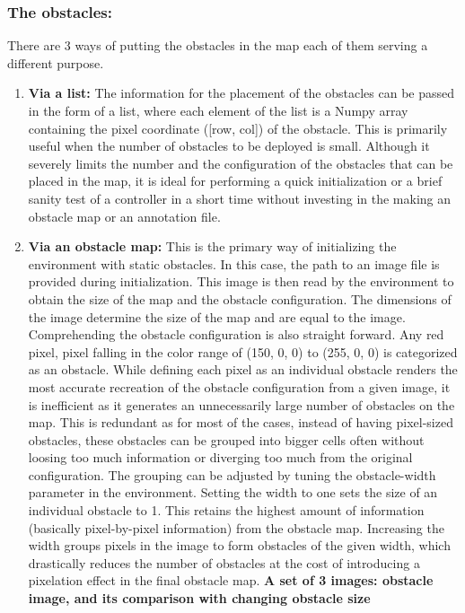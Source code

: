 \subsubsection*{The obstacles:}
There are 3 ways of putting the obstacles in the map each of them serving a different purpose.
\begin{enumerate}
\item \textbf{Via a list:}
The information for the placement of the obstacles can be passed in the form of a list, where each element of the list is a Numpy array containing the pixel coordinate ([row, col]) of the obstacle. This is primarily useful when the number of obstacles to be deployed is small. Although it severely limits the number and the configuration of the obstacles that can be placed in the map, it is ideal for performing a quick initialization or a brief sanity test of a controller in a short time without investing in the making an obstacle map or an annotation file.
\item \textbf{Via an obstacle map:}
This is the primary way of initializing the environment with static obstacles. In this case, the path to an image file is provided during initialization. This image is then read by the environment to obtain the size of the map and the obstacle configuration. 
The dimensions of the image determine the size of the map and are equal to the image. Comprehending the obstacle configuration is also straight forward. Any red pixel, pixel falling in the color range of (150, 0, 0) to (255, 0, 0) is categorized as an obstacle. While defining each pixel as an individual obstacle renders the most accurate recreation of the obstacle configuration from a given image, it is inefficient as it generates an unnecessarily large number of obstacles on the map.
This is redundant as for most of the cases, instead of having pixel-sized obstacles,  these obstacles can be grouped into bigger cells often without loosing too much information or diverging too much from the original configuration. The grouping can be adjusted by tuning the obstacle-width parameter in the environment.  Setting the width to one sets the size of an individual obstacle to 1. This retains the highest amount of information (basically pixel-by-pixel information) from the obstacle map. Increasing the width groups pixels in the image to form obstacles of the given width, which drastically reduces the number of obstacles at the cost of introducing a pixelation effect in the final obstacle map.
\textbf{A set of 3 images: obstacle image, and its comparison with changing obstacle size}

\end{enumerate}
